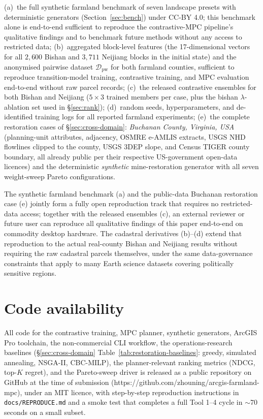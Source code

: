 \documentclass[11pt]{article}
\begin{document}
(a)~the full synthetic farmland benchmark of seven landscape presets with deterministic generators (Section~\ref{sec:bench}) under CC-BY 4.0; this benchmark alone is end-to-end sufficient to reproduce the contrastive-MPC pipeline's qualitative findings and to benchmark future methods without any access to restricted data;
(b)~aggregated block-level features (the 17-dimensional vectors for all $2{,}600$ Bishan and $3{,}711$ Neijiang blocks in the initial state) and the anonymised pairwise dataset $\mathcal{D}_{\text{pw}}$ for both farmland counties, sufficient to reproduce transition-model training, contrastive training, and MPC evaluation end-to-end without raw parcel records;
(c)~the released contrastive ensembles for both Bishan and Neijiang ($5 \times 3$ trained members per case, plus the bishan $\lambda$-ablation set used in \S\ref{sec:rank});
(d)~random seeds, hyperparameters, and de-identified training logs for all reported farmland experiments;
(e)~the complete restoration cases of \S\ref{sec:cross-domain}: \emph{Buchanan County, Virginia, USA} (planning-unit attributes, adjacency, OSMRE e-AMLIS extracts, USGS NHD flowlines clipped to the county, USGS 3DEP slope, and Census TIGER county boundary, all already public per their respective US-government open-data licences) and the deterministic \emph{synthetic} mine-restoration generator with all seven weight-sweep Pareto configurations.

The synthetic farmland benchmark (a) and the public-data Buchanan restoration case (e) jointly form a fully open reproduction track that requires no restricted-data access; together with the released ensembles (c), an external reviewer or future user can reproduce all qualitative findings of this paper end-to-end on commodity desktop hardware. The cadastral derivatives (b)--(d) extend that reproduction to the actual real-county Bishan and Neijiang results without requiring the raw cadastral parcels themselves, under the same data-governance constraints that apply to many Earth science datasets covering politically sensitive regions.

\section*{Code availability}
All code for the contrastive training, MPC planner, synthetic generators, ArcGIS Pro toolchain, the non-commercial CLI workflow, the operations-research baselines (\S\ref{sec:cross-domain} Table~\ref{tab:restoration-baselines}: greedy, simulated annealing, NSGA-II, CBC-MILP), the planner-relevant ranking metrics (NDCG, top-$K$ regret), and the Pareto-sweep driver is released as a public repository on GitHub at the time of submission (https://github.com/zhouning/arcgis-farmland-mpc), under an MIT licence, with step-by-step reproduction instructions in \texttt{docs/REPRODUCE.md} and a smoke test that completes a full Tool 1--4 cycle in $\sim$70 seconds on a small subset.
\end{document}
